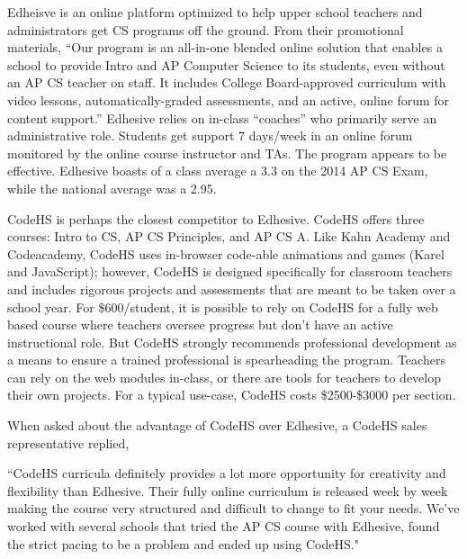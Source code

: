 Edheisve is an online platform optimized to help upper school teachers and administrators get CS programs off the ground. From their promotional materials, ``Our program is an all-in-one blended online solution that enables a school to provide Intro and AP Computer Science to its students, even without an AP CS teacher on staff. It includes College Board-approved curriculum with video lessons, automatically-graded assessments, and an active, online forum for content support.'' Edhesive relies on in-class ``coaches'' who primarily serve an administrative role. Students get support 7 days/week in an online forum monitored by the online course instructor and TAs. The program appears to be effective. Edhesive boasts of a class average a 3.3 on the 2014 AP CS Exam, while the national average was a 2.95.\par

CodeHS is perhaps the closest competitor to Edhesive. CodeHS offers three courses: Intro to CS, AP CS Principles, and AP CS A. Like Kahn Academy and Codeacademy, CodeHS uses in-browser code-able animations and games (Karel and JavaScript); however, CodeHS is designed specifically for classroom teachers and includes rigorous projects and assessments that are meant to be taken over a school year. For \$600/student, it is possible to rely on CodeHS for a fully web based course where teachers oversee progress but don't have an active instructional role. But CodeHS strongly recommends professional development as a means to ensure a trained professional is spearheading the program. Teachers can rely on the web modules in-class, or there are tools for teachers to develop their own projects. For a typical use-case, CodeHS costs \$2500-\$3000 per section.  \par
When asked about the advantage of CodeHS over Edhesive, a CodeHS sales representative replied,
\begin{blockquote}
	``CodeHS curricula definitely provides a lot more opportunity for creativity and flexibility than Edhesive. Their fully online curriculum is released week by week making the course very structured and difficult to change to fit your needs. We've worked with several schools that tried the AP CS course with Edhesive, found the strict pacing to be a problem and ended up using CodeHS."
\end{blockquote}

